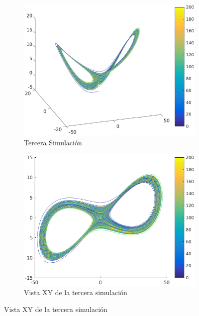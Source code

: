 \documentclass[12pt,letterpaper]{article}
\begin{document}

\begin{figure}
	\centering
	\begin{subfigure}[t]{0.36\textwidth}
		\includegraphics[width=\textwidth]{pictures/tercera_simulacion}
		\caption{Tercera Simulación}
		\label{fig:simulacion3}
	\end{subfigure}
	\begin{subfigure}[t]{0.36\textwidth}
		\includegraphics[width=\textwidth]{pictures/tercera_simulacion_xy}
		\caption{Vista XY de la tercera simulación}

\end{subfigure}
\end{figure}
\end{document}
